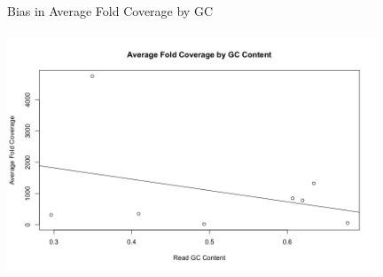 \documentclass[11pt]{beamer}
\begin{document}
	
	\begin{frame}{Bias in Average Fold Coverage by GC}
	\includegraphics[height=8cm, width=11cm]{Viral_Coverage_by_GC.png}
	\end{frame}
	
\end{document}
